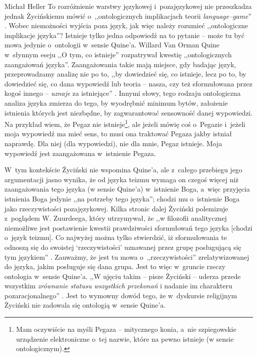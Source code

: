 \begin{artplenv}{Michał Heller}
To rozróżnienie warstwy językowej i~pozajęzykowej nie przeszkadza jednak Życińskiemu mówić o~,,ontologicznych implikacjach teorii \textit{language--game}''
\parencite[][s.~18]{zycinski_teizm_1985}. %
 Wobec niemożności wyjścia poza język, jak więc należy rozumieć ,,ontologiczne implikacje języka''? Istnieje tylko jedna odpowiedź na to pytanie -- może tu być mowa jedynie o~ontologii w~sensie Quine'a. Willard Van Orman Quine w~słynnym eseju ,,O tym, co istnieje'' 
\parencite[][]{quine_o_1969} %
 rozpatrywał kwestię ,,ontologicznych zaangażowań języka''. Zaangażowania takie mają miejsce, gdy badając język, przeprowadzamy analizę nie po to, ,,by dowiedzieć się, co istnieje, lecz po to, by dowiedzieć się, co dana wypowiedź lub teoria -- nasza, czy też sformułowana przez kogoś innego -- \textit{uznaje} za istniejące''
\parencite[][s.~29]{quine_o_1969}. %
 Innymi słowy, tego rodzaju ontologiczna analiza języka zmierza do tego, by wyodrębnić minimum bytów, założenie istnienia których jest niezbędne, by zagwarantować sensowność danej wypowiedzi. Na przykład wiem, że Pegaz nie istnieje\footnote{Mam oczywiście na myśli Pegaza -- mitycznego konia, a~nie szpiegowskie urządzenie elektroniczne o~tej nazwie, które na pewno istnieje (w sensie ontologicznym).}, ale jeżeli mówię coś o~Pegazie i~jeżeli moja wypowiedź ma mieć sens, to musi ona traktować Pegaza jakby istniał naprawdę. Dla niej (dla wypowiedzi), nie dla mnie, Pegaz istnieje. Moja wypowiedź jest zaangażowana w~istnienie Pegaza.

W~tym kontekście Życiński nie wspomina Quine'a, ale z~całego przebiegu jego argumentacji jasno wynika, że od języka teizmu wymaga on czegoś więcej niż zaangażowania tego języka (w sensie Quine'a) w~istnienie Boga, a~więc przyjęcia istnienia Boga jedynie ,,na potrzeby tego języka''; chodzi mu o~istnienie Boga jako rzeczywistości pozajęzykowej. Kilka stronic dalej Życiński polemizuje z~poglądem W. Zuurdeega, który utrzymywał, że ,,w filozofii analitycznej niemożliwe jest postawienie kwestii prawdziwości sformułowań tego języka [chodzi o~język teizmu]. Co najwyżej można tylko stwierdzić, iż sformułowania te odnoszą się do swoistej ‘rzeczywistości' uznawanej przez grupę posługującą się tym językiem''
\parencite[][s.~28]{zycinski_teizm_1985}. %
 Zauważmy, że jest tu mowa o~,,rzeczywistości'' zrelatywizowanej do języka, jakim posługuje się dana grupa. Jest to więc w~gruncie rzeczy ontologia w~sensie Quine'a. ,,W ujęciu takim -- pisze Życiński -- uderza przede wszystkim \textit{zrównanie statusu wszystkich przekonań} i nadanie im charakteru pozaracjonalnego'' 
\parencite[][s.~28]{zycinski_teizm_1985}. %
 Jest to wymowny dowód tego, że w~dyskursie religijnym Życiński nie zadowala się ontologią w~sensie Quine'a.


\end{artplenv}
